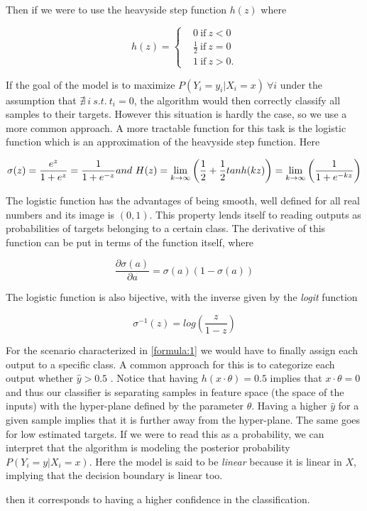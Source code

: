 Then if we were to use the heavyside step function $h(z)$  where

\[
    h(z) =
      \begin{cases}
        &0 \ \mbox{if} \ z<0 \\
        &\frac{1}{2} \ \mbox{if} \  z=0 \\
        &1 \ \mbox{if} \  z>0.
      \end{cases}
    \]

If the goal of the model is to maximize $P(Y_i = y_i | X_i = x) \ \forall i$
under the assumption that $\nexists\  i \  s.t. \ t_i = 0$, the algorithm would then correctly classify all samples to their targets. However this situation is hardly the case, so we use a more common approach. A more tractable function for this task is the logistic function which is an approximation of the heavyside step function. Here  

\begin{equation} \label{eq:logisticFunction}
\sigma(z)  = \frac{e^{z}}{1 + e^{z}} = \frac{1}{1 + e^{-z}}  \\
and \  H(z) = \lim_{k \to \infty} \left(\frac{1}{2} + \frac{1}{2}tanh(kz) \right) = \lim_{k \to \infty} \left(\frac{1}{1+e^{-kz}} \right)  
\end{equation}

The logistic function has the advantages of being smooth, well defined for all real numbers and its image is $(0,1)$. This property lends itself to reading outputs as probabilities of targets belonging to a certain class. The derivative of this function can be put in terms of the function itself, where

\begin{equation} \label{eq:derivativeLogisticFunction}
\frac{\partial \sigma(a)}{\partial a}  = \sigma(a)( 1 - \sigma(a) )    
\end{equation}

The logistic function is also bijective, with the inverse given by the \textit{logit} function 

\begin{equation} \label{eq:logitFunction}
\sigma^{-1}(z)  = log( \frac{z}{1 - z})    
\end{equation}

For the scenario characterized in \ref{formula:1} we would have to finally assign each output to a specific class. A common approach for this is to categorize each output whether $\hat{y} > 0.5$ \label{formula:logitThreshold}. Notice that having $h(x \cdot \theta) = 0.5$ implies that $x \cdot  \theta = 0$ and thus our classifier is separating samples in feature space (the space of the inputs) with the hyper-plane defined by the parameter $\theta$. Having a higher $\hat{y}$ for a given sample implies that it is further away from the hyper-plane. The same goes for low estimated targets. If we were to read this as a probability, we can interpret that the algorithm is modeling the posterior probability $P(Y_i = y | X_i = x)$. Here the model is said to be \textit{linear} because it is linear in $X$, implying that the decision boundary is linear too. 

then it corresponds to having a higher confidence in the classification.


